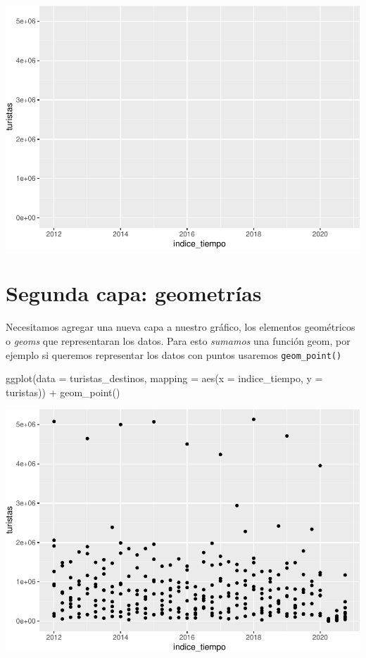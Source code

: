 \documentclass[
  openany]{book}
\newenvironment{Shaded}{\begin{snugshade}}{\end{snugshade}}
\newcommand{\AttributeTok}[1]{\textcolor[rgb]{0.77,0.63,0.00}{#1}}
\newcommand{\FunctionTok}[1]{\textcolor[rgb]{0.00,0.00,0.00}{#1}}
\newcommand{\NormalTok}[1]{#1}
\newcommand{\SpecialCharTok}[1]{\textcolor[rgb]{0.00,0.00,0.00}{#1}}
\begin{document}
\begin{center}\includegraphics[width=1\linewidth]{DT6_files/figure-latex/unnamed-chunk-47-1} \end{center}

\hypertarget{segunda-capa-geometruxedas}{%
\section{Segunda capa: geometrías}\label{segunda-capa-geometruxedas}}

Necesitamos agregar una nueva capa a nuestro gráfico, los elementos geométricos o \emph{geoms} que representaran los datos.
Para esto \emph{sumamos} una función geom, por ejemplo si queremos representar los datos con puntos usaremos \texttt{geom\_point()}

\begin{Shaded}
\begin{Highlighting}[]
\FunctionTok{ggplot}\NormalTok{(}\AttributeTok{data =}\NormalTok{ turistas\_destinos, }\AttributeTok{mapping =} \FunctionTok{aes}\NormalTok{(}\AttributeTok{x =}\NormalTok{ indice\_tiempo, }\AttributeTok{y =}\NormalTok{ turistas)) }\SpecialCharTok{+}
  \FunctionTok{geom\_point}\NormalTok{()}
\end{Highlighting}
\end{Shaded}

\begin{center}\includegraphics[width=1\linewidth]{DT6_files/figure-latex/unnamed-chunk-48-1} \end{center}
\end{document}

